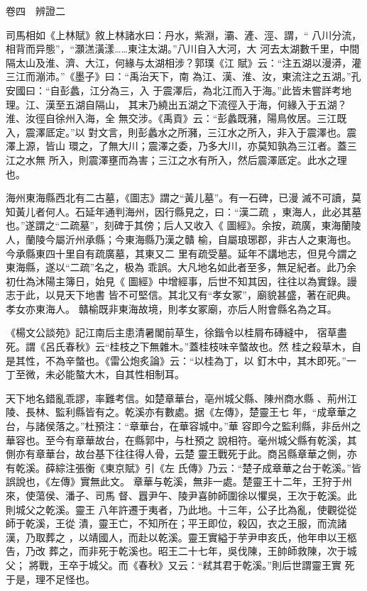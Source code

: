 \documentclass{ctexart}
\begin{document}
卷四　辨證二

司馬相如《上林賦》敘上林諸水曰：丹水，紫淵，灞、滻、涇、謂，`` 八川分流，相背而异態''，``灝溔潢漾……東注太湖。''八川自入大河，大 河去太湖數千里，中間隔太山及淮、濟、大江，何緣与太湖相涉？郭璞《江 賦》云：``注五湖以漫漭，灌三江而漰沛。''《墨子》曰：``禹治天下，南 為江、漢、淮、汝，東流注之五湖。''孔安國曰：``自彭蠡，江分為三，入 于震澤后，為北江而入于海。''此皆未嘗詳考地理。江、漢至五湖自隔山， 其末乃繞出五湖之下流徑入于海，何緣入于五湖？淮、汝徑自徐州入海，全 無交涉。《禹貢》云：``彭蠡既瀦，陽鳥攸居。三江既入，震澤厎定。''以 對文言，則彭蠡水之所瀦，三江水之所入，非入于震澤也。震澤上源，皆山 環之，了無大川；震澤之委，乃多大川，亦莫知孰為三江者。蓋三江之水無 所入，則震澤壅而為害；三江之水有所入，然后震澤厎定。此水之理也。

海州東海縣西北有二古墓，《圖志》謂之``黃儿墓''。有一石碑，已漫 滅不可讀，莫知黃儿者何人。石延年通判海州，因行縣見之，曰：``漢二疏 ，東海人，此必其墓也。''遂謂之``二疏墓''，刻碑于其傍；后人又收入《 圖經》。余按，疏廣，東海蘭陵人，蘭陵今屬沂州承縣；今東海縣乃漢之贛 榆，自屬琅琊郡，非古人之東海也。今承縣東四十里自有疏廣墓，其東又二 里有疏受墓。延年不講地志，但見今謂之東海縣，遂以``二疏''名之，极為 乖誤。大凡地名如此者至多，無足紀者。此乃余初仕為沐陽主簿日，始見《 圖經》中增經事，后世不知其因，往往以為實錄。謾志于此，以見天下地書 皆不可堅信。其北又有``孝女冢''，廟貌甚盛，著在祀典。孝女亦東海人。 贛榆既非東海故境，則孝女冢廟，亦后人附會縣名為之耳。

《楊文公談苑》記江南后主患清暑閣前草生，徐鍇令以桂屑布磚縫中， 宿草盡死。謂《呂氏春秋》云``桂枝之下無雜木。''蓋桂枝味辛螫故也。然 桂之殺草木，自是其性，不為辛螫也。《雷公炮炙論》云：``以桂為丁，以 釘木中，其木即死。''一丁至微，未必能螯大木，自其性相制耳。

天下地名錯亂乖謬，率難考信。如楚章華台，亳州城父縣、陳州商水縣 、荊州江陵、長林、監利縣皆有之。乾溪亦有數處。据《左傳》，楚靈王七 年，``成章華之台，与諸侯落之。''杜預注：``章華台，在華容城中。''華 容即今之監利縣，非岳州之華容也。至今有章華故台，在縣郭中，与杜預之 說相符。毫州城父縣有乾溪，其側亦有章華台，故台基下往往得人骨，云楚 靈王戰死于此。商呂縣章華之側，亦有乾溪。薛綜注張衡《東京賦》引《左 氏傳》乃云：``楚子成章華之台于乾溪。''皆誤說也，《左傳》實無此文。 章華与乾溪，無非一處。楚靈王十二年，王狩于州來，使蕩侯、潘子、司馬 督、囂尹午、陵尹喜帥師圍徐以懼吳，王次于乾溪。此則城父之乾溪。靈王 八年許遷于夷者，乃此地。十三年，公子比為亂，使觀從從師于乾溪，王從 潰，靈王亡，不知所在；平王即位，殺囚，衣之王服，而流諸漢，乃取葬之 ，以靖國人，而赴以乾溪。靈王實縊于芋尹申亥氏，他年申以王柩告，乃改 葬之，而非死于乾溪也。昭王二十七年，吳伐陳，王帥師救陳，次于城父； 將戰，王卒于城父。而《春秋》又云：``弒其君于乾溪。''則后世謂靈王實 死于是，理不足怪也。
\end{document}
